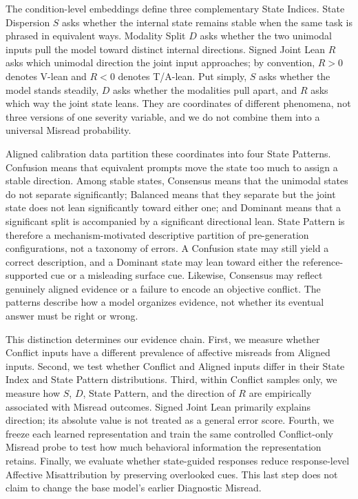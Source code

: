 The condition-level embeddings define three complementary State Indices. State
Dispersion \(S\) asks whether the internal state remains stable when the same task is
phrased in equivalent ways. Modality Split \(D\) asks whether the two unimodal inputs
pull the model toward distinct internal directions. Signed Joint Lean \(R\) asks
which unimodal direction the joint input approaches; by convention, \(R>0\) denotes
V-lean and \(R<0\) denotes T/A-lean. Put simply, \(S\) asks whether the model stands
steadily, \(D\) asks whether the modalities pull apart, and \(R\) asks which way the
joint state leans. They are coordinates of different phenomena, not three versions of
one severity variable, and we do not combine them into a universal Misread
probability.

Aligned calibration data partition these coordinates into four State Patterns.
Confusion means that equivalent prompts move the state too much to assign a stable
direction. Among stable states, Consensus means that the unimodal states do not
separate significantly; Balanced means that they separate but the joint state does
not lean significantly toward either one; and Dominant means that a significant
split is accompanied by a significant directional lean. State Pattern is therefore
a mechanism-motivated descriptive partition of pre-generation configurations, not a
taxonomy of errors. A Confusion state may still yield a correct description, and a Dominant state
may lean toward either the reference-supported cue or a misleading surface cue.
Likewise, Consensus may reflect genuinely aligned evidence or a failure to encode an
objective conflict. The patterns describe how a model organizes evidence, not whether
its eventual answer must be right or wrong.

This distinction determines our evidence chain. First, we measure whether Conflict
inputs have a different prevalence of affective misreads from Aligned inputs. Second,
we test whether Conflict and Aligned inputs differ in their State Index and State
Pattern distributions. Third, within Conflict samples only, we measure how \(S\),
\(D\), State Pattern, and the direction of \(R\) are empirically associated with
Misread outcomes. Signed Joint Lean primarily explains direction; its absolute value
is not treated as a general error score. Fourth, we freeze each learned representation
and train the same controlled Conflict-only Misread probe to test how much behavioral
information the representation retains. Finally, we evaluate whether state-guided
responses reduce response-level Affective Misattribution by preserving overlooked
cues. This last step does not claim to change the base model's earlier Diagnostic
Misread.


